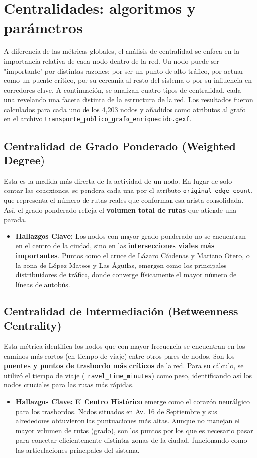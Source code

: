     
\section{Centralidades: algoritmos y parámetros}

    A diferencia de las métricas globales, el análisis de centralidad se enfoca en la importancia relativa de cada nodo dentro de la red. Un nodo puede ser "importante" por distintas razones: por ser un punto de alto tráfico, por actuar como un puente crítico, por su cercanía al resto del sistema o por su influencia en corredores clave. A continuación, se analizan cuatro tipos de centralidad, cada una revelando una faceta distinta de la estructura de la red. Los resultados fueron calculados para cada uno de los 4,203 nodos y añadidos como atributos al grafo en el archivo \texttt{transporte\_publico\_grafo\_enriquecido.gexf}.

    \subsection{Centralidad de Grado Ponderado (Weighted Degree)}
    Esta es la medida más directa de la actividad de un nodo. En lugar de solo contar las conexiones, se pondera cada una por el atributo \texttt{original\_edge\_count}, que representa el número de rutas reales que conforman esa arista consolidada. Así, el grado ponderado refleja el \textbf{volumen total de rutas} que atiende una parada.
    \begin{itemize}
        \item \textbf{Hallazgos Clave:} Los nodos con mayor grado ponderado no se encuentran en el centro de la ciudad, sino en las \textbf{intersecciones viales más importantes}. Puntos como el cruce de Lázaro Cárdenas y Mariano Otero, o la zona de López Mateos y Las Águilas, emergen como los principales distribuidores de tráfico, donde converge físicamente el mayor número de líneas de autobús.
    \end{itemize}

    \subsection{Centralidad de Intermediación (Betweenness Centrality)}
    Esta métrica identifica los nodos que con mayor frecuencia se encuentran en los caminos más cortos (en tiempo de viaje) entre otros pares de nodos. Son los \textbf{puentes y puntos de trasbordo más críticos} de la red. Para su cálculo, se utilizó el tiempo de viaje (\texttt{travel\_time\_minutes}) como peso, identificando así los nodos cruciales para las rutas más rápidas.
    \begin{itemize}
        \item \textbf{Hallazgos Clave:} El \textbf{Centro Histórico} emerge como el corazón neurálgico para los trasbordos. Nodos situados en Av. 16 de Septiembre y sus alrededores obtuvieron las puntuaciones más altas. Aunque no manejan el mayor volumen de rutas (grado), son los puntos por los que es necesario pasar para conectar eficientemente distintas zonas de la ciudad, funcionando como las articulaciones principales del sistema.
    \end{itemize}


